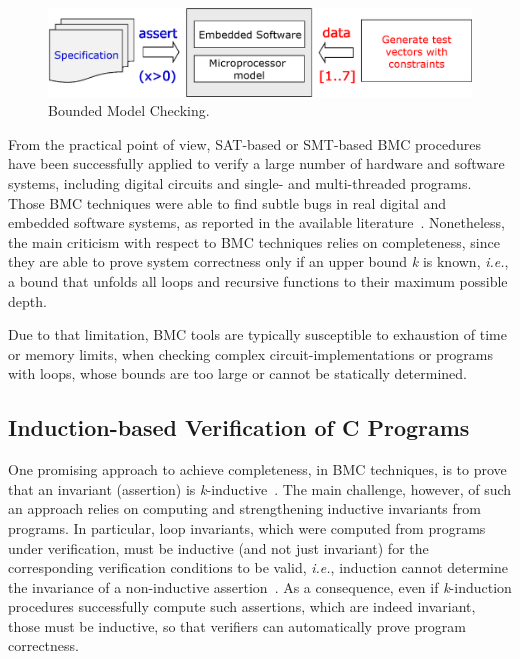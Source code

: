 \documentclass{acm_sen_article}
\begin{document}
\begin{figure}[h]
	\centering
	\includegraphics[scale=0.35]{figure2.eps}
	\caption{Bounded Model Checking.}
	\label{bounded-model-checking}
\end{figure}


From the practical point of view, SAT-based or SMT-based BMC procedures have been successfully applied to verify a large number of hardware and software systems, including digital circuits and single- and multi-threaded programs. Those BMC techniques were able to find subtle bugs in real digital and embedded software systems, as reported in the available literature~\cite{Clarke04,MerzFS12,CordeiroF11,Ivancic05,Cordeiro12}. Nonetheless, the main criticism with respect to BMC techniques relies on completeness, since they are able to prove system correctness only if an upper bound \textit{k} is known, {\it i.e.}, a bound that unfolds all loops and recursive functions to their maximum possible depth. 

Due to that limitation, BMC tools are typically susceptible to exhaustion of time or memory limits, when checking complex circuit-implementations or programs with loops, whose bounds are too large or cannot be statically determined.  

\subsection{Induction-based Verification of C Programs}

One promising approach to achieve completeness, in BMC techniques, is to prove that an invariant (assertion) is \textit{k}-inductive~\cite{EenS03,Sheera00}. The main challenge, however, of such an approach relies on computing and strengthening inductive invariants from programs. In particular, loop invariants, which were computed from programs under verification, must be inductive (and not just invariant) for the corresponding verification conditions to be valid, {\it i.e.}, induction cannot determine the invariance of a non-inductive assertion~\cite{Bradley07}. As a consequence, even if \textit{k}-induction procedures successfully compute such assertions, which are indeed invariant, those must be inductive, so that verifiers can automatically prove program correctness.
\end{document}
